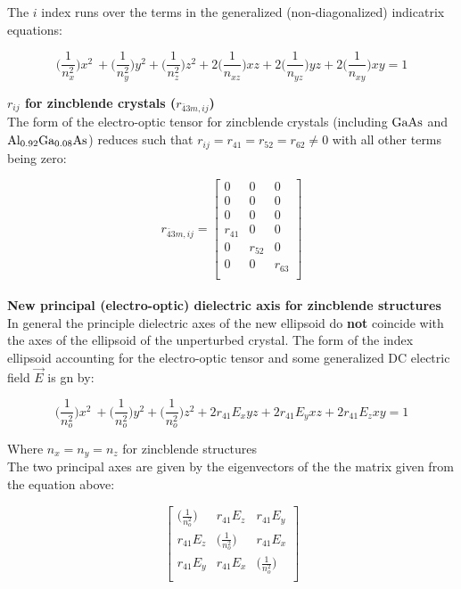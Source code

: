 The $i$ index runs over the terms in the generalized (non-diagonalized) indicatrix equations:

\begin{equation}
\bigg(\frac{1}{n_x^2} \bigg) x^2\ + \bigg(\frac{1}{n_y^2} \bigg) y^2 + \bigg(\frac{1}{n_z^2} \bigg) z^2 + 2 \bigg(\frac{1}{n_{xz}} \bigg)xz + 2 \bigg(\frac{1}{n_{yz}} \bigg)yz + 2 \bigg(\frac{1}{n_{xy}} \bigg)xy = 1
\end{equation}



\noindent \textbf{$r_{ij}$ for zincblende crystals ($r_{\bar{4}3m, ij}$)}
\\
The form of the electro-optic tensor for zincblende crystals (including $\mathrm{GaAs}$ and $\mathrm{Al_{0.92}Ga_{0.08}As}$) reduces such that $r_{ij} = r_{41} = r_{52} = r_{62} \neq 0$ with all other terms being zero:

\begin{equation}
r_{\bar{4}3m,ij} =
 \left[ {\begin{array}{ccc}
  0 & 0 & 0\\
  0 & 0 & 0\\
  0 & 0 & 0\\
  r_{41} & 0 & 0\\
  0 & r_{52} & 0\\
  0 & 0 & r_{63}\\
 \end{array}} \right]
\end{equation}
\\
\noindent \textbf{New principal (electro-optic) dielectric axis for zincblende structures}
\\
In general the principle dielectric axes of the new ellipsoid do \textbf{not} coincide with the axes of the ellipsoid of the unperturbed crystal. The form of the index ellipsoid accounting for the electro-optic tensor and some generalized DC electric field $\vec{E}$ is gn by:

\begin{equation}\label{eq:zindicatrix}
\bigg(\frac{1}{n_o^2} \bigg) x^2\ + \bigg(\frac{1}{n_o^2} \bigg) y^2 + \bigg(\frac{1}{n_o^2} \bigg) z^2  + 2r_{41} E_x yz + 2r_{41} E_y xz + 2r_{41}E_z xy= 1
\end{equation}

Where $n_x = n_y = n_z$ for zincblende structures
\\

The two principal axes are given by the eigenvectors of the the matrix given from the equation above:

\begin{equation}
 \left[ {\begin{array}{ccc}
   \big( \frac{1}{n_o ^2} \big)& r_{41}E_z & r_{41} E_y\\
   r_{41}E_z & \big( \frac{1}{n_o ^2} \big) & r_{41} E_x\\
   r_{41} E_y & r_{41} E_x & \big( \frac{1}{n_o ^2} \big)\\
  \end{array}} \right]
\end{equation}

